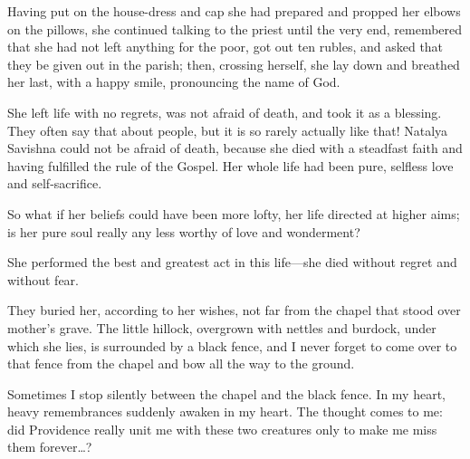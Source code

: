 Having put on the house-dress and cap she had prepared and propped her elbows on the pillows, she continued talking to the priest until the very end, remembered that she had not left anything for the poor, got out ten rubles, and asked that they be given out in the parish; then, crossing herself, she lay down and breathed her last, with a happy smile, pronouncing the name of God.

She left life with no regrets, was not afraid of death, and took it as a blessing. They often say that about people, but it is so rarely actually like that! Natalya Savishna could not be afraid of death, because she died with a steadfast faith and having fulfilled the rule of the Gospel. Her whole life had been pure, selfless love and self-sacrifice.

So what if her beliefs could have been more lofty, her life directed at higher aims; is her pure soul really any less worthy of love and wonderment?

She performed the best and greatest act in this life---she died without regret and without fear.

They buried her, according to her wishes, not far from the chapel that stood over mother's grave. The little hillock, overgrown with nettles and burdock, under which she lies, is surrounded by a black fence, and I never forget to come over to that fence from the chapel and bow all the way to the ground.

Sometimes I stop silently between the chapel and the black fence. In my heart, heavy remembrances suddenly awaken in my heart. The thought comes to me: did Providence really unit me with these two creatures only to make me miss them forever\ldots{}?
